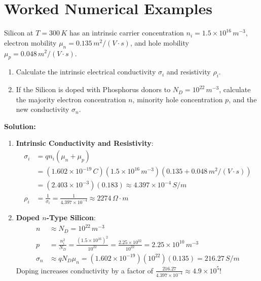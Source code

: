 \section{Worked Numerical Examples}

\begin{example}
Silicon at $T = 300\,\si{K}$ has an intrinsic carrier concentration $n_i = 1.5 \times 10^{16}\,\si{m^{-3}}$, electron mobility $\mu_n = 0.135\,\si{m^2/(V\cdot s)}$, and hole mobility $\mu_p = 0.048\,\si{m^2/(V\cdot s)}$.
\begin{enumerate}
    \item Calculate the intrinsic electrical conductivity $\sigma_i$ and resistivity $\rho_i$.
    \item If the Silicon is doped with Phosphorus donors to $N_D = 10^{22}\,\si{m^{-3}}$, calculate the majority electron concentration $n$, minority hole concentration $p$, and the new conductivity $\sigma_n$.
\end{enumerate}

\textbf{Solution:}
\begin{enumerate}
    \item \textbf{Intrinsic Conductivity and Resistivity}:
    \begin{align*}
        \sigma_i &= q n_i (\mu_n + \mu_p) \\
        &= (1.602 \times 10^{-19}\,\si{C})(1.5 \times 10^{16}\,\si{m^{-3}})(0.135 + 0.048\,\si{m^2/(V\cdot s)}) \\
        &= (2.403 \times 10^{-3})(0.183) \approx 4.397 \times 10^{-4}\,\si{S/m} \\
        \rho_i &= \frac{1}{\sigma_i} = \frac{1}{4.397 \times 10^{-4}} \approx 2274\,\si{\Omega\cdot m}
    \end{align*}
    
    \item \textbf{Doped $n$-Type Silicon}:
    \begin{align*}
        n &\approx N_D = 10^{22}\,\si{m^{-3}} \\
        p &= \frac{n_i^2}{N_D} = \frac{(1.5 \times 10^{16})^2}{10^{22}} = \frac{2.25 \times 10^{32}}{10^{22}} = 2.25 \times 10^{10}\,\si{m^{-3}} \\
        \sigma_n &\approx q N_D \mu_n = (1.602 \times 10^{-19})(10^{22})(0.135) = 216.27\,\si{S/m}
    \end{align*}
    Doping increases conductivity by a factor of $\frac{216.27}{4.397 \times 10^{-4}} \approx 4.9 \times 10^5$!
\end{enumerate}
\end{example}

